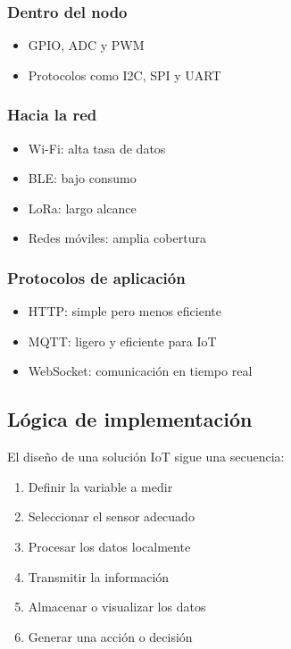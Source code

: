 \documentclass[conference]{IEEEtran}
\begin{document}
\subsubsection{Dentro del nodo}
\begin{itemize}
    \item GPIO, ADC y PWM
    \item Protocolos como I2C, SPI y UART
\end{itemize}

\subsubsection{Hacia la red}
\begin{itemize}
    \item Wi-Fi: alta tasa de datos
    \item BLE: bajo consumo
    \item LoRa: largo alcance
    \item Redes móviles: amplia cobertura
\end{itemize}

\subsubsection{Protocolos de aplicación}
\begin{itemize}
    \item HTTP: simple pero menos eficiente
    \item MQTT: ligero y eficiente para IoT
    \item WebSocket: comunicación en tiempo real
\end{itemize}

\subsection{Lógica de implementación}

El diseño de una solución IoT sigue una secuencia:

\begin{enumerate}
    \item Definir la variable a medir
    \item Seleccionar el sensor adecuado
    \item Procesar los datos localmente
    \item Transmitir la información
    \item Almacenar o visualizar los datos
    \item Generar una acción o decisión
\end{enumerate}
\end{document}
